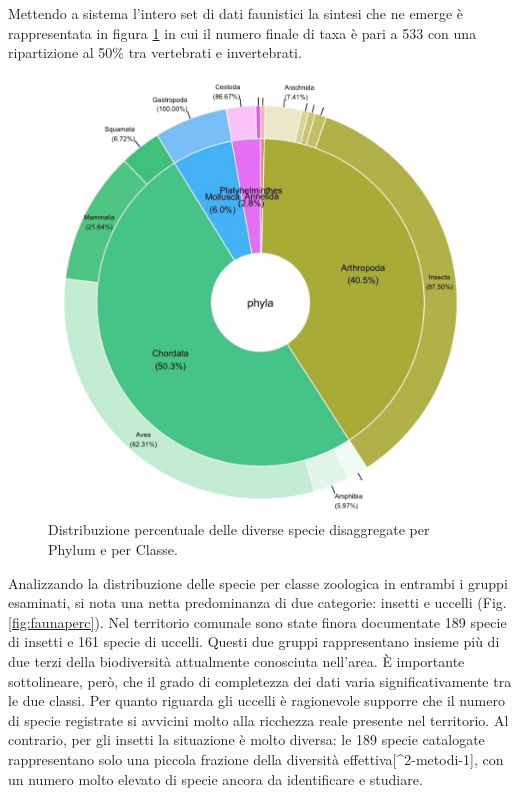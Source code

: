 \documentclass[
  a4paper,
]{book}
\begin{document}
Mettendo a sistema l'intero set di dati faunistici la sintesi che ne emerge è rappresentata in figura \ref{fig:faunaSpoletoAll} in cui il numero finale di taxa è pari a 533 con una ripartizione al 50\% tra vertebrati e invertebrati.

\begin{figure}

{\centering \includegraphics[width=\linewidth]{./figs/faunaSpoletoAll} 

}

\caption{Distribuzione percentuale delle diverse specie disaggregate per Phylum e per Classe.}\label{fig:faunaSpoletoAll}
\end{figure}

Analizzando la distribuzione delle specie per classe zoologica in entrambi i gruppi esaminati, si nota una netta predominanza di due categorie: insetti e uccelli (Fig. \ref{fig:faunaperc}).
Nel territorio comunale sono state finora documentate 189 specie di insetti e 161 specie di uccelli.
Questi due gruppi rappresentano insieme più di due terzi della biodiversità attualmente conosciuta nell'area.
È importante sottolineare, però, che il grado di completezza dei dati varia significativamente tra le due classi.
Per quanto riguarda gli uccelli è ragionevole supporre che il numero di specie registrate si avvicini molto alla ricchezza reale presente nel territorio.
Al contrario, per gli insetti la situazione è molto diversa: le 189 specie catalogate rappresentano solo una piccola frazione della diversità effettiva{[}\^{}2-metodi-1{]}, con un numero molto elevato di specie ancora da identificare e studiare.
\end{document}
